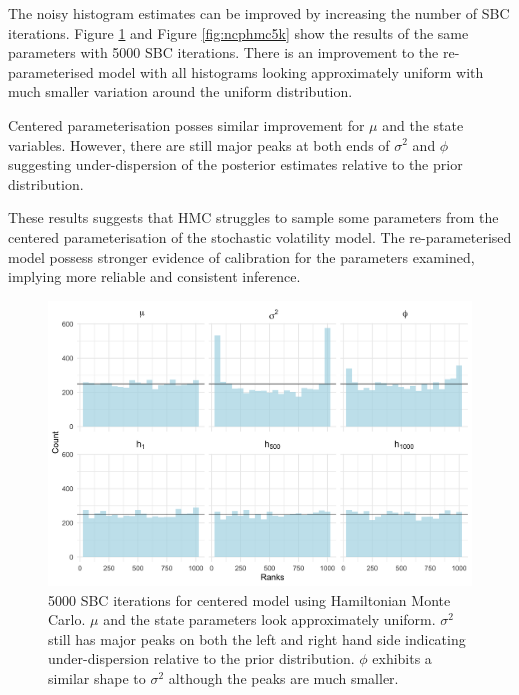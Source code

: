 \documentclass[12pt, a4paper]{article}
\begin{document}
    The noisy histogram estimates can be improved by increasing the number of SBC iterations. Figure \ref{fig:cphmc5k} and Figure \ref{fig:ncphmc5k} show the results of the same parameters with 5000 SBC iterations. There is an improvement to the re-parameterised model with all histograms looking approximately uniform with much smaller variation around the uniform distribution. 
    
    Centered parameterisation posses similar improvement for $\mu$ and the state variables. However, there are still major peaks at both ends of $\sigma^2$ and $\phi$ suggesting under-dispersion of the posterior estimates relative to the prior distribution.

    These results suggests that HMC struggles to sample some parameters from the centered parameterisation of the stochastic volatility model. The re-parameterised model possess stronger evidence of calibration for the parameters examined, implying more reliable and consistent inference.

    \begin{figure}[H]
        \centering
        \includegraphics[scale=0.09]{results/hmc_cp_5k.png}
        \caption{5000 SBC iterations for centered model using Hamiltonian Monte Carlo. $\mu$ and the state parameters look approximately uniform. $\sigma^2$ still has major peaks on both the left and right hand side indicating under-dispersion relative to the prior distribution. $\phi$ exhibits a similar shape to $\sigma^2$ although the peaks are much smaller.}
        \label{fig:cphmc5k}
    \end{figure}
\end{document}
